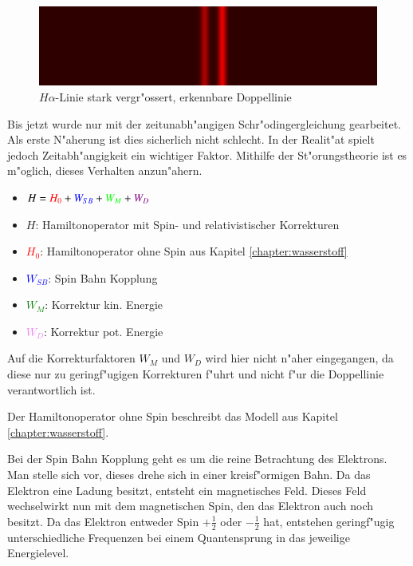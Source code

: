 \begin{refsection}
\begin{figure}
	\centering
	\includegraphics[width = .6\columnwidth]{atomuhr/fine_structure_hydrogen.png}
	\caption{$H\alpha$-Linie stark vergr"ossert, erkennbare
          Doppellinie \cite{pic:wasserstoff_feinstruktur}}
        \label{atomuhr:fineStructure}
\end{figure}

Bis jetzt wurde nur mit der zeitunabh"angigen Schr"odingergleichung gearbeitet.
Als erste N"aherung ist dies sicherlich nicht schlecht.
In der Realit"at spielt jedoch Zeitabh"angigkeit ein wichtiger Faktor. 
Mithilfe der St"orungstheorie ist es m"oglich, dieses Verhalten anzun"ahern.

\begin{itemize}
	\item[]  $H = \textcolor{red}{H_0}+ \textcolor{blue}{W_{SB}} + 
		\textcolor{green}{W_M} + \textcolor{violet}{W_D} $
	\item[]  $H$: Hamiltonoperator mit Spin- und relativistischer Korrekturen
	\item[]  \textcolor{red}{$H_0$}: Hamiltonoperator ohne Spin
          aus Kapitel \ref{chapter:wasserstoff}
	\item[]  \textcolor{blue}{$W_{SB}$}: Spin Bahn Kopplung
	\item[]  \textcolor{green}{$W_M$}: Korrektur kin. Energie
	\item[]  \textcolor{violet}{$W_D$}: Korrektur pot. Energie
	
\end{itemize}
		
Auf die Korrekturfaktoren $W_M$ und $W_D$ wird hier nicht n"aher
eingegangen, da diese nur zu geringf"ugigen Korrekturen f"uhrt und
nicht f"ur die Doppellinie verantwortlich ist.

Der Hamiltonoperator ohne Spin beschreibt das Modell aus Kapitel
\ref{chapter:wasserstoff}.

Bei der Spin Bahn Kopplung geht es um die reine Betrachtung des
Elektrons. Man stelle sich vor, dieses drehe sich in einer
kreisf"ormigen Bahn.  Da das Elektron eine Ladung besitzt, entsteht
ein magnetisches Feld.  Dieses Feld wechselwirkt nun mit dem
magnetischen Spin, den das Elektron auch noch besitzt.  Da das
Elektron entweder Spin \(+\frac{1}{2}\) oder \(-\frac{1}{2}\) hat,
entstehen geringf"ugig unterschiedliche Frequenzen bei einem
Quantensprung in das jeweilige Energielevel.


\end{refsection}
